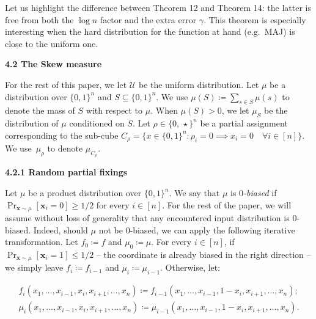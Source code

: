 


Let us highlight the difference between Theorem 12 and Theorem 14: the latter is free from both the $\log n$ factor and the extra error $\gamma$. This theorem is especially interesting when the hard distribution for the function at hand (e.g. MAJ) is close to the uniform one.\par





\par\medskip\noindent\textbf{
4.2 The Skew measure}\par




For the rest of this paper, we let $\mathcal{U}$ be the uniform distribution. Let $\mu$ be a distribution over $\{0,1\}^{n}$ and $S\subseteq\{0,1\}^{n}$. We use $\mu(S)\coloneqq\sum_{s\in S}\mu(s)$ to denote the mass of $S$ with respect to $\mu$. When $\mu(S)>0$, we let $\mu_{S}$ be the distribution of $\mu$ conditioned on $S$. Let $\rho\in\{0,\,\star\}^{n}$ be a partial assignment corresponding to the sub-cube $C_{\rho}=\{x\in\{0,1\}^{n}:\rho_{i}=0\implies x_{i}=0\quad\forall i\in[n]\}$. We use $\mu_{\rho}$ to denote $\mu_{C_{\rho}}$.\par




\par\medskip\noindent\textbf{
4.2.1 Random partial fixings}\par




Let $\mu$ be a product distribution over $\{0,1\}^{n}$. We say that $\mu$ is \emph{$0$-biased} if $\Pr_{\bm{x}\sim\mu}[\bm{x}_{i}=0]\geq 1/2$ for every $i\in[n]$. For the rest of the paper, we will assume without loss of generality that any encountered input distribution is $0$-biased. Indeed, should $\mu$ not be $0$-biased, we can apply the following iterative transformation. Let $f_{0}\coloneqq f$ and $\mu_{0}\coloneqq\mu$. For every $i\in[n]$, if $\Pr_{\bm{x}\sim\mu}[\bm{x}_{i}=1]\leq 1/2$ – the coordinate is already biased in the right direction – we simply leave $f_{i}\coloneqq f_{i-1}$ and $\mu_{i}\coloneqq\mu_{i-1}$. Otherwise, let:\par


\[\begin{gathered}
\displaystyle f_{i}(x_{1},\ldots,x_{i-1},x_{i},x_{i+1},\ldots,x_{n})\coloneqq f_{i-1}(x_{1},\ldots,x_{i-1},1-x_{i},x_{i+1},\ldots,x_{n}); \\
\displaystyle\mu_{i}(x_{1},\ldots,x_{i-1},x_{i},x_{i+1},\ldots,x_{n})\coloneqq\mu_{i-1}(x_{1},\ldots,x_{i-1},1-x_{i},x_{i+1},\ldots,x_{n}).
\end{gathered}\]


